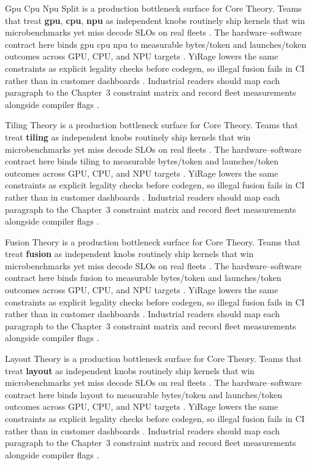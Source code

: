 Gpu Cpu Npu Split is a production bottleneck surface for Core Theory. Teams that treat \textbf{gpu}, \textbf{cpu}, \textbf{npu} as independent knobs routinely ship kernels that win microbenchmarks yet miss decode SLOs on real fleets \citep{amd2024aie,kwon2023vllm}. The hardware--software contract here binds gpu cpu npu to measurable bytes/token and launches/token outcomes across GPU, CPU, and NPU targets \citep{dlbook,nvidia2024cudagraphs}. YiRage lowers the same constraints as explicit legality checks before codegen, so illegal fusion fails in CI rather than in customer dashboards \citep{dao2022flashattention,liu2024deepseekv3}. Industrial readers should map each paragraph to the Chapter~3 constraint matrix and record fleet measurements alongside compiler flags \citep{kwon2023vllm,patel2025llminference}.

Tiling Theory is a production bottleneck surface for Core Theory. Teams that treat \textbf{tiling} as independent knobs routinely ship kernels that win microbenchmarks yet miss decode SLOs on real fleets \citep{dlbook,nvidia2024cudagraphs}. The hardware--software contract here binds tiling to measurable bytes/token and launches/token outcomes across GPU, CPU, and NPU targets \citep{dao2022flashattention,liu2024deepseekv3}. YiRage lowers the same constraints as explicit legality checks before codegen, so illegal fusion fails in CI rather than in customer dashboards \citep{kwon2023vllm,patel2025llminference}. Industrial readers should map each paragraph to the Chapter~3 constraint matrix and record fleet measurements alongside compiler flags \citep{nvidia2024cudagraphs,taxbreak2026}.

Fusion Theory is a production bottleneck surface for Core Theory. Teams that treat \textbf{fusion} as independent knobs routinely ship kernels that win microbenchmarks yet miss decode SLOs on real fleets \citep{dao2022flashattention,liu2024deepseekv3}. The hardware--software contract here binds fusion to measurable bytes/token and launches/token outcomes across GPU, CPU, and NPU targets \citep{kwon2023vllm,patel2025llminference}. YiRage lowers the same constraints as explicit legality checks before codegen, so illegal fusion fails in CI rather than in customer dashboards \citep{nvidia2024cudagraphs,taxbreak2026}. Industrial readers should map each paragraph to the Chapter~3 constraint matrix and record fleet measurements alongside compiler flags \citep{liu2024deepseekv3,memoryfloor2026}.

Layout Theory is a production bottleneck surface for Core Theory. Teams that treat \textbf{layout} as independent knobs routinely ship kernels that win microbenchmarks yet miss decode SLOs on real fleets \citep{kwon2023vllm,patel2025llminference}. The hardware--software contract here binds layout to measurable bytes/token and launches/token outcomes across GPU, CPU, and NPU targets \citep{nvidia2024cudagraphs,taxbreak2026}. YiRage lowers the same constraints as explicit legality checks before codegen, so illegal fusion fails in CI rather than in customer dashboards \citep{liu2024deepseekv3,memoryfloor2026}. Industrial readers should map each paragraph to the Chapter~3 constraint matrix and record fleet measurements alongside compiler flags \citep{patel2025llminference,nvidia2022hopper}.

